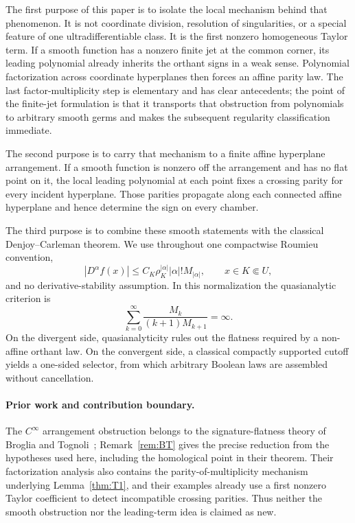 \documentclass[11pt]{article}
\theoremstyle{definition}
\theoremstyle{remark}
\begin{document}
The first purpose of this paper is to isolate the local mechanism behind that phenomenon. It is not coordinate division, resolution of singularities, or a special feature of one ultradifferentiable class. It is the first nonzero homogeneous Taylor term. If a smooth function has a nonzero finite jet at the common corner, its leading polynomial already inherits the orthant signs in a weak sense. Polynomial factorization across coordinate hyperplanes then forces an affine parity law. The last factor-multiplicity step is elementary and has clear antecedents; the point of the finite-jet formulation is that it transports that obstruction from polynomials to arbitrary smooth germs and makes the subsequent regularity classification immediate.

The second purpose is to carry that mechanism to a finite affine hyperplane arrangement. If a smooth function is nonzero off the arrangement and has no flat point on it, the local leading polynomial at each point fixes a crossing parity for every incident hyperplane. Those parities propagate along each connected affine hyperplane and hence determine the sign on every chamber.

The third purpose is to combine these smooth statements with the classical Denjoy--Carleman theorem. We use throughout one compactwise Roumieu convention,
\[
 |D^\alpha f(x)|\le C_K\rho_K^{|\alpha|}|\alpha|!M_{|\alpha|},
 \qquad x\in K\Subset U,
\]
and no derivative-stability assumption. In this normalization the quasianalytic criterion is
\[
 \sum_{k=0}^{\infty}\frac{M_k}{(k+1)M_{k+1}}=\infty.
\]
On the divergent side, quasianalyticity rules out the flatness required by a non-affine orthant law. On the convergent side, a classical compactly supported cutoff yields a one-sided selector, from which arbitrary Boolean laws are assembled without cancellation.

\paragraph{Prior work and contribution boundary.}
The $C^\infty$ arrangement obstruction belongs to the signature-flatness theory of Broglia and Tognoli~\cite{BrogliaTognoli1989}; Remark~\ref{rem:BT} gives the precise reduction from the hypotheses used here, including the homological point in their theorem. Their factorization analysis also contains the parity-of-multiplicity mechanism underlying Lemma~\ref{thm:T1}, and their examples already use a first nonzero Taylor coefficient to detect incompatible crossing parities. Thus neither the smooth obstruction nor the leading-term idea is claimed as new.
\end{document}
